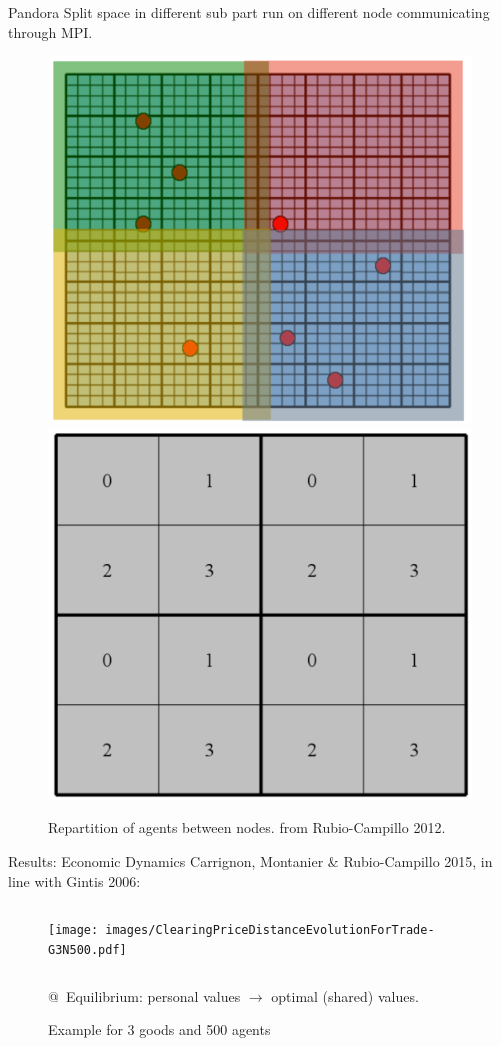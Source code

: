 \documentclass[10pt, notes=show]{beamer}
\begin{document}
\begin{frame}{Pandora}
    Split space in different sub part run on different node communicating through MPI.
    \begin{figure}[h]
        \centering
        \includegraphics[width=.3\textwidth]{images/splitPandora.png}
        \includegraphics[width=.3\textwidth]{images/numbersCPU.png}
        \caption{Repartition of agents between nodes. from Rubio-Campillo 2012.}
        \label{fig:splp}
    \end{figure}
\end{frame}

\begin{frame}{Results: Economic Dynamics}
    Carrignon, Montanier \& Rubio-Campillo 2015, in line with Gintis 2006:
	\begin{figure}
	    \caption{Example for 3 goods and 500 agents}
	    \begin{columns}
		\texttt{[image: images/ClearingPriceDistanceEvolutionForTrade-G3N500.pdf]}\\
	    \end{columns}
		@~Equilibrium: personal values  $\rightarrow$ optimal (shared) values.
	\end{figure}
\end{frame}
\end{document}
